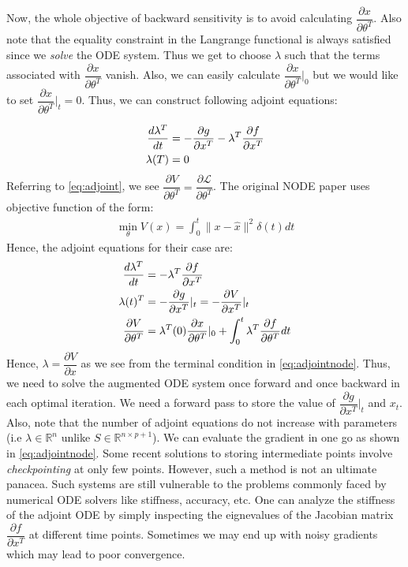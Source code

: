 \documentclass[fontsize=11pt]{article}
\newcommand{\R}{\mathbb{R}}
\newcommand{\norm}[1]{\lVert #1 \rVert}
\theoremstyle{definition}
\begin{document}
Now, the whole objective of backward sensitivity is to avoid calculating $\dfrac{\partial x}{\partial \theta^T}$.
Also note that the equality constraint in the Langrange functional is always satisfied
since we \textit{solve} the ODE system. Thus we get to choose $\lambda$ such that the terms
associated with $\dfrac{\partial x}{\partial \theta^T}$ vanish. Also, we can 
easily calculate $\dfrac{\partial x}{\partial \theta^T}|_0$ but we would like to set
$\dfrac{\partial x}{\partial \theta^T}|_t = 0$. Thus, we can construct following adjoint 
equations:

\begin{align}
    \dfrac{d\lambda^T}{dt} &= -\dfrac{\partial g}{\partial x^T} - \lambda^T \dfrac{\partial f}{\partial x^T} \notag \\
    \lambda(T) &= 0
\end{align}
Referring to \cref{eq:adjoint}, we see $\dfrac{\partial V}{\partial \theta^T} = 
\dfrac{\partial \mathcal{L}}{\partial \theta^T}$.
The original NODE paper uses objective function of the form:
\begin{align}
    \min\limits_{\theta}V(x) = \int_0^t \norm{x - \hat{x}}^2 \delta(t) dt
\end{align}
Hence, the adjoint equations for their case are:
\begin{align}
    \dfrac{d\lambda^T}{dt} &= -\lambda^T \dfrac{\partial f}{\partial x^T} \notag \\
    \lambda(t)^T &= - \dfrac{\partial g}{\partial x^T}|_t = -\dfrac{\partial V}{\partial x^T}|_t \notag \\
    \dfrac{\partial V}{\partial \theta^T} &= \lambda^T(0)\dfrac{\partial x}{\partial \theta^T}|_0 + \int_0^t   \lambda^T \dfrac{\partial f}{\partial \theta^T} dt
    \label{eq:adjointnode}
\end{align}
Hence, $\lambda = \dfrac{\partial V}{\partial x}$ as we see from the terminal 
condition in \cref{eq:adjointnode}.
Thus, we need to solve the augmented ODE system once forward 
and once backward in each optimal iteration. We need a forward pass to store
the value of $\dfrac{\partial g}{\partial x^T}|_t$ and $x_t$. Also, note that the number 
of adjoint equations do not increase with parameters (i.e $\lambda \in \R^n$ unlike $S \in \R^{n \times p+1}$). 
We can evaluate the gradient in one go as shown in \cref{eq:adjointnode}. 
Some recent solutions to storing intermediate points involve \textit{checkpointing}
at only few points. However, such a method is not 
an ultimate panacea. Such systems are still vulnerable to the problems commonly faced by
numerical ODE solvers like stiffness, accuracy, etc. One can analyze the stiffness
of the adjoint ODE by simply inspecting the eignevalues of the Jacobian matrix $\dfrac{\partial f}{\partial x^T}$
at different time points. Sometimes we may end up with noisy gradients which may lead to poor convergence.
\end{document}
